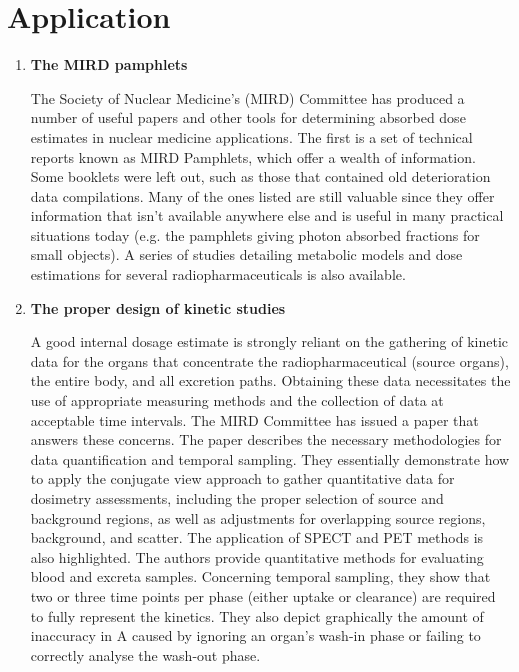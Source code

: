 \documentclass[12pt]{article}
\begin{document}
\section{Application}
\begin{enumerate}
\item \textbf{ The MIRD pamphlets} \par The Society of Nuclear Medicine's (MIRD) Committee has produced a number of useful papers and other tools for determining absorbed dose estimates in nuclear medicine applications. The first is a set of technical reports known as MIRD Pamphlets, which offer a wealth of information. Some booklets were left out, such as those that contained old deterioration data compilations. Many of the ones listed are still valuable since they offer information that isn't available anywhere else and is useful in many practical situations today (e.g. the pamphlets giving photon absorbed fractions for small objects). A series of studies detailing metabolic models and dose estimations for several radiopharmaceuticals is also available.

\item \textbf{ The proper design of kinetic studies} \par  A good internal dosage estimate is strongly reliant on the gathering of kinetic data for the organs that concentrate the radiopharmaceutical (source organs), the entire body, and all excretion paths. Obtaining these data necessitates the use of appropriate measuring methods and the collection of data at acceptable time intervals. The MIRD Committee has issued a paper that answers these concerns. The paper describes the necessary methodologies for data quantification and temporal sampling. They essentially demonstrate how to apply the conjugate view approach to gather quantitative data for dosimetry assessments, including the proper selection of source and background regions, as well as adjustments for overlapping source regions, background, and scatter. The application of SPECT and PET methods is also highlighted. The authors provide quantitative methods for evaluating blood and excreta samples. Concerning temporal sampling, they show that two or three time points per phase (either uptake or clearance) are required to fully represent the kinetics. They also depict graphically the amount of inaccuracy in A caused by ignoring an organ's wash-in phase or failing to correctly analyse the wash-out phase.
\end{enumerate}
\end{document}

